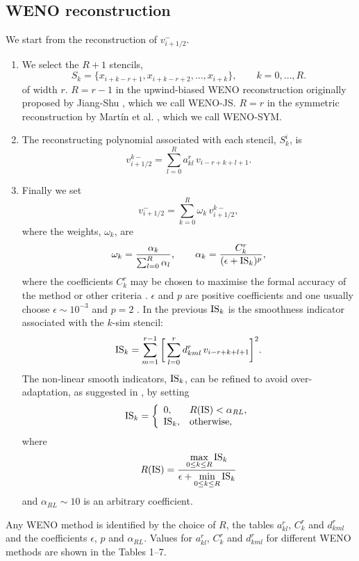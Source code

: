 \subsection{WENO reconstruction}
We start from the reconstruction of $v_{i+1/2}^-$.
\begin{enumerate}
  \item We select the $R+1$ stencils,
  \[
    S_k = \{ x_{i+k-r+1}, x_{i+k-r+2}, \ldots, x_{i+k} \}, \qquad k = 0,
    \ldots, R.
  \]
  of width $r$. $R = r-1$ in the upwind-biased WENO reconstruction
  originally proposed by Jiang-Shu \cite{jiang}, which we call WENO-JS. $R =
  r$ in the symmetric reconstruction by Mart\'in et al. \cite{martin}, which we
  call WENO-SYM.
  \item The reconstructing polynomial associated with each stencil, $S_k^i$, is
  \[
    v_{i+1/2}^{k-} = \sum_{l=0}^R a^r_{kl}\, v_{i-r+k+l+1}.
  \]
  \item Finally we set
  \[
    v_{i+1/2}^- = \sum_{k=0}^R \omega_k\, v^{k-}_{i+1/2},
  \]
  where the weights, $\omega_k$, are
  \[
    \omega_k = \frac{\alpha_k}{\sum_{l=0}^R \alpha_l}, \qquad
    \alpha_k = \frac{C^r_k}{(\epsilon + \mathrm{IS}_k)^p},
  \]
  where the coefficients $C^r_k$ may be chosen to maximise the formal accuracy
  of the method or other criteria \cite{martin}. $\epsilon$ and $p$ are positive
  coefficients and one usually choose $\epsilon \sim 10^{-3}$ and $p = 2$
  \cite{jiang}. In the previous $\mathrm{IS}_k$ is the smoothness indicator associated
  with the $k$-sim stencil:
  \[
    \mathrm{IS}_k = \sum_{m=1}^{r-1} \bigg[ \sum_{l=0}^{r} d^r_{kml}\, v_{i-r+k+l+1}
    \bigg]^2.
  \]
  The non-linear smooth indicators, $\mathrm{IS}_k$, can be refined to avoid
  over-adaptation, as suggested in \cite{taylor}, by setting
  \[
    \mathrm{IS}_k = \left\{
    \begin{array}{ll}
      0,     & R(\mathrm{IS}) < \alpha_{RL},    \\
      \mathrm{IS}_k, & \textrm{otherwise},
    \end{array}\right.
  \]
  where
  \[
    R(\mathrm{IS}) = \frac{\displaystyle\max_{0 \leq k \leq R} \mathrm{IS}_k}{\displaystyle
    \epsilon + \min_{0\leq k \leq R} \mathrm{IS}_k}
  \]
  and $\alpha_{RL} \sim 10$ is an arbitrary coefficient.
\end{enumerate}

Any WENO method is identified by the choice of $R$, the tables $a^r_{kl}$,
$C^r_k$ and $d^r_{kml}$ and the coefficients $\epsilon$, $p$ and $\alpha_{RL}$.
Values for $a^r_{kl}$, $C^r_k$ and $d^r_{kml}$ for different WENO methods are
shown in the Tables 1--7.

